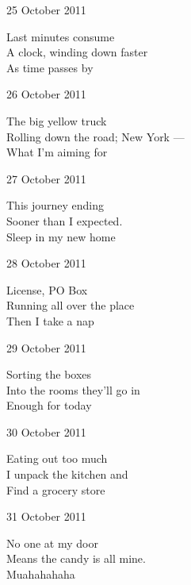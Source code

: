 \documentclass[12pt]{article}
\begin{document}
\newpage

25 October 2011

Last minutes consume \\
A clock, winding down faster \\
As time passes by

26 October 2011

The big yellow truck \\
Rolling down the road; New York --- \\
What I'm aiming for

27 October 2011

This journey ending \\
Sooner than I expected. \\
Sleep in my new home

28 October 2011

License, PO Box \\
Running all over the place \\
Then I take a nap

29 October 2011

Sorting the boxes \\
Into the rooms they'll go in \\
Enough for today

30 October 2011

Eating out too much \\
I unpack the kitchen and \\
Find a grocery store

31 October 2011

No one at my door \\
Means the candy is all mine. \\
Muahahahaha

\newpage
\end{document}
